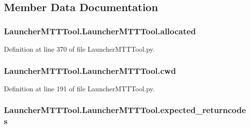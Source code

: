 \subsection{Member Data Documentation}
\hypertarget{class_launcher_m_t_t_tool_1_1_launcher_m_t_t_tool_a79266b94da58ec136cca44c1f735d3a7}{
\subsubsection[{allocated}]{\setlength{\rightskip}{0pt plus 5cm}Launcher\-M\-T\-T\-Tool.\-Launcher\-M\-T\-T\-Tool.\-allocated}}\label{class_launcher_m_t_t_tool_1_1_launcher_m_t_t_tool_a79266b94da58ec136cca44c1f735d3a7}


Definition at line 370 of file Launcher\-M\-T\-T\-Tool.\-py.

\hypertarget{class_launcher_m_t_t_tool_1_1_launcher_m_t_t_tool_a7bcf1056b03f3777ef4ed39f7e063f36}{
\subsubsection[{cwd}]{\setlength{\rightskip}{0pt plus 5cm}Launcher\-M\-T\-T\-Tool.\-Launcher\-M\-T\-T\-Tool.\-cwd}}\label{class_launcher_m_t_t_tool_1_1_launcher_m_t_t_tool_a7bcf1056b03f3777ef4ed39f7e063f36}


Definition at line 191 of file Launcher\-M\-T\-T\-Tool.\-py.

\hypertarget{class_launcher_m_t_t_tool_1_1_launcher_m_t_t_tool_ae68abb344ae827a5ce0ee79446020c63}{
\subsubsection[{expected\-\_\-returncodes}]{\setlength{\rightskip}{0pt plus 5cm}Launcher\-M\-T\-T\-Tool.\-Launcher\-M\-T\-T\-Tool.\-expected\-\_\-returncodes}}\label{class_launcher_m_t_t_tool_1_1_launcher_m_t_t_tool_ae68abb344ae827a5ce0ee79446020c63}


